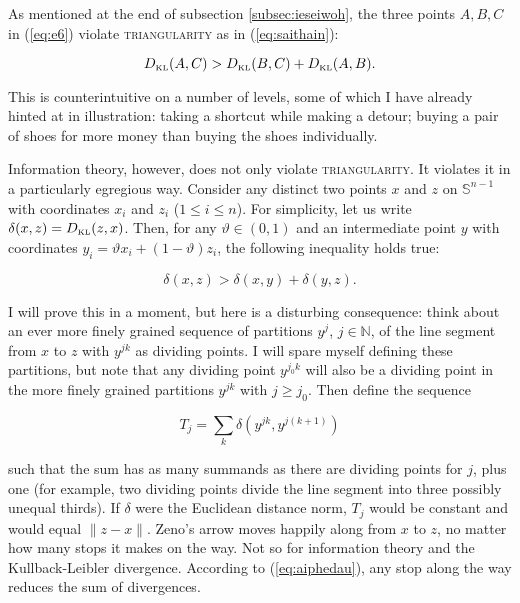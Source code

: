 \documentclass[11pt]{article}
\begin{document}
As mentioned at the end of subsection \ref{subsec:ieseiwoh}, the three
points $A,B,C$ in (\ref{eq:e6}) violate \textsc{triangularity} as in
(\ref{eq:saithain}):

\begin{equation}
  \label{eq:yohliimo}
  D_{\mbox{\tiny KL}}(A,C)>D_{\mbox{\tiny KL}}(B,C)+D_{\mbox{\tiny KL}}(A,B).
\end{equation}

This is counterintuitive on a number of levels, some of which I have
already hinted at in illustration: taking a shortcut while making a
detour; buying a pair of shoes for more money than buying the shoes
individually. 

Information theory, however, does not only violate
\textsc{triangularity}. It violates it in a particularly egregious
way. Consider any distinct two points $x$ and $z$ on
$\mathbb{S}^{n-1}$ with coordinates $x_{i}$ and $z_{i}$
($1\leq{}i\leq{}n$). For simplicity, let us write
$\delta(x,z)=D_{\mbox{\tiny KL}}(z,x)$. Then, for any
$\vartheta\in{}(0,1)$ and an intermediate point $y$ with coordinates
$y_{i}=\vartheta{}x_{i}+(1-\vartheta)z_{i}$, the following inequality
holds true:

\begin{equation}
  \label{eq:aiphedau}
  \delta(x,z)>\delta\left(x,y\right)+\delta\left(y,z\right).
\end{equation}

I will prove this in a moment, but here is a disturbing consequence:
think about an ever more finely grained sequence of partitions
$y^{j}$, $j\in\mathbb{N}$, of the line segment from $x$ to $z$ with
$y^{jk}$ as dividing points. I will spare myself defining these
partitions, but note that any dividing point $y^{j_{0}k}$ will also be
a dividing point in the more finely grained partitions $y^{jk}$ with
$j\geq{}j_{0}$. Then define the sequence

\begin{equation}
  \label{eq:queireiw}
  T_{j}=\sum_{k}\delta\left(y^{jk},y^{j(k+1)}\right)
\end{equation}

such that the sum has as many summands as there are dividing points
for $j$, plus one (for example, two dividing points divide the line
segment into three possibly unequal thirds). If $\delta$ were the
Euclidean distance norm, $T_{j}$ would be constant and would equal
$\|z-x\|$. Zeno's arrow moves happily along from $x$ to $z$, no matter
how many stops it makes on the way. Not so for information theory and
the Kullback-Leibler divergence. According to (\ref{eq:aiphedau}), any
stop along the way reduces the sum of divergences.
\end{document}
